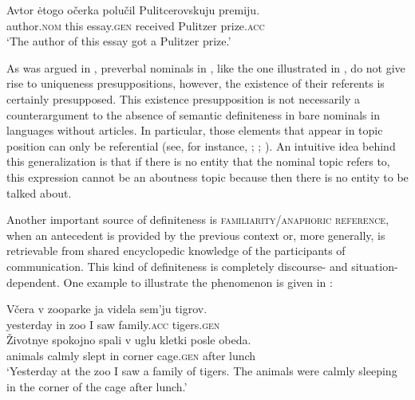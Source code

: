 \documentclass[output=paper]{langscibook}
\begin{document}
\ea \label{ex:seres:32}
\gll	Avtor				ėtogo		očerka		polučil		Pulitcerovskuju	premiju. \\
       	author.\textsc{nom} 	this		essay.\textsc{gen} 	received 	Pulitzer 				prize.\textsc{acc}\\
       	\glt `The author of this essay got a Pulitzer prize.'
    \z

\noindent As was argued in , preverbal nominals in , like the one illustrated in , do not give rise to uniqueness presuppositions, however, the existence of their referents is certainly presupposed. This existence presupposition
is not necessarily a counterargument to the absence of semantic definiteness in bare nominals in languages without articles. In particular, those elements that appear in topic position can only be referential (see, for instance, \citealt{Reinhart1981}; \citealt{Erteschik-Shir1998}; \citealt{Endriss2009}). An intuitive idea behind this generalization is that if there is no entity that the nominal topic refers to, this expression cannot be an aboutness topic because then there is no entity to be talked about. %

Another important source of definiteness is \textsc{familiarity/anaphoric reference}, when an antecedent is provided by the previous context or, more generally, is retrievable from shared encyclopedic knowledge of the participants of communication.
This kind of definiteness is completely discourse- and situation-dependent. One example to illustrate the phenomenon is given in :

\ea \label{ex:seres:33}
\gll	Včera			v	zooparke	ja	videla	sem'ju		tigrov.\\
	yesterday	in	zoo          	I	saw		family.\textsc{acc}	tigers.\textsc{gen}\\
	\gll Životnye	spokojno	spali	v	uglu		kletki			posle	obeda.\\
	animals		calmly      	slept	in	corner	cage.\textsc{gen} 	after	lunch\\
\glt `Yesterday at the zoo I saw a family of tigers. The animals were calmly sleeping in the corner of the cage after lunch.'
\z
\end{document}
